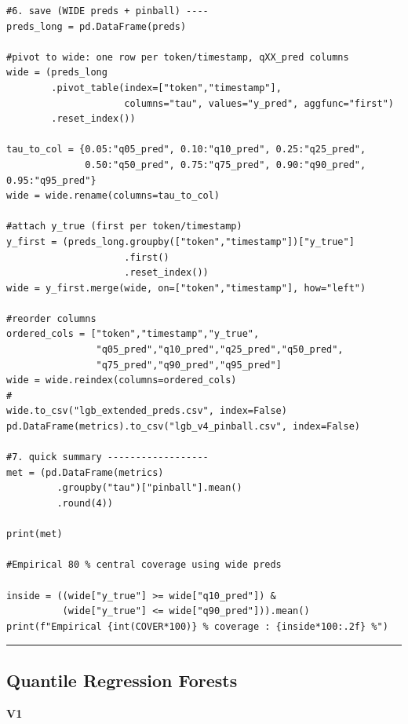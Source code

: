 \documentclass[
  a4paper,
  DIV=11,
  numbers=noendperiod]{scrreprt}
\begin{document}
\begin{verbatim}
#6. save (WIDE preds + pinball) ----
preds_long = pd.DataFrame(preds)

#pivot to wide: one row per token/timestamp, qXX_pred columns
wide = (preds_long
        .pivot_table(index=["token","timestamp"],
                     columns="tau", values="y_pred", aggfunc="first")
        .reset_index())

tau_to_col = {0.05:"q05_pred", 0.10:"q10_pred", 0.25:"q25_pred",
              0.50:"q50_pred", 0.75:"q75_pred", 0.90:"q90_pred", 0.95:"q95_pred"}
wide = wide.rename(columns=tau_to_col)

#attach y_true (first per token/timestamp)
y_first = (preds_long.groupby(["token","timestamp"])["y_true"]
                     .first()
                     .reset_index())
wide = y_first.merge(wide, on=["token","timestamp"], how="left")

#reorder columns
ordered_cols = ["token","timestamp","y_true",
                "q05_pred","q10_pred","q25_pred","q50_pred",
                "q75_pred","q90_pred","q95_pred"]
wide = wide.reindex(columns=ordered_cols)
# 
wide.to_csv("lgb_extended_preds.csv", index=False)
pd.DataFrame(metrics).to_csv("lgb_v4_pinball.csv", index=False)

#7. quick summary ------------------
met = (pd.DataFrame(metrics)
         .groupby("tau")["pinball"].mean()
         .round(4))

print(met)

#Empirical 80 % central coverage using wide preds

inside = ((wide["y_true"] >= wide["q10_pred"]) &
          (wide["y_true"] <= wide["q90_pred"])).mean()
print(f"Empirical {int(COVER*100)} % coverage : {inside*100:.2f} %")
\end{verbatim}

\begin{center}\rule{0.5\linewidth}{0.5pt}\end{center}

\subsection{Quantile Regression
Forests}\label{quantile-regression-forests}

\textbf{V1}
\end{document}
